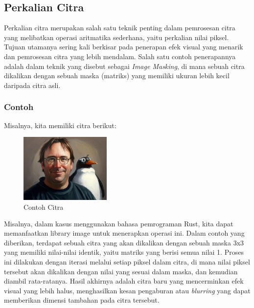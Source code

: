 \documentclass[a4paper,12pt,openany]{book}
\begin{document}
\subsection{Perkalian Citra}
Perkalian citra merupakan salah satu teknik penting dalam pemrosesan citra yang melibatkan operasi aritmatika sederhana, yaitu perkalian nilai piksel. Tujuan utamanya sering kali berkisar pada penerapan efek visual yang menarik dan pemrosesan citra yang lebih mendalam. Salah satu contoh penerapannya adalah dalam teknik yang disebut sebagai \textit{Image Masking}, di mana sebuah citra dikalikan dengan sebuah maska (matriks) yang memiliki ukuran lebih kecil daripada citra asli.

\subsubsection{Contoh}
Misalnya, kita memiliki citra berikut:
\begin{figure}[H]
    \centering
    \includegraphics[width=0.4\textwidth]{./image/arithmetic/linux-torvalds-penguin-painting.jpg}
    \caption{Contoh Citra}
\end{figure}

Misalnya, dalam kasus menggunakan bahasa pemrograman Rust, kita dapat memanfaatkan library image untuk menerapkan operasi ini. Dalam contoh yang diberikan, terdapat sebuah citra yang akan dikalikan dengan sebuah maska 3x3 yang memiliki nilai-nilai identik, yaitu matriks yang berisi semua nilai 1. Proses ini dilakukan dengan iterasi melalui setiap piksel dalam citra, di mana nilai piksel tersebut akan dikalikan dengan nilai yang sesuai dalam maska, dan kemudian diambil rata-ratanya. Hasil akhirnya adalah citra baru yang mencerminkan efek visual yang lebih halus, menghasilkan kesan pengaburan atau \textit{blurring} yang dapat memberikan dimensi tambahan pada citra tersebut.
\end{document}
